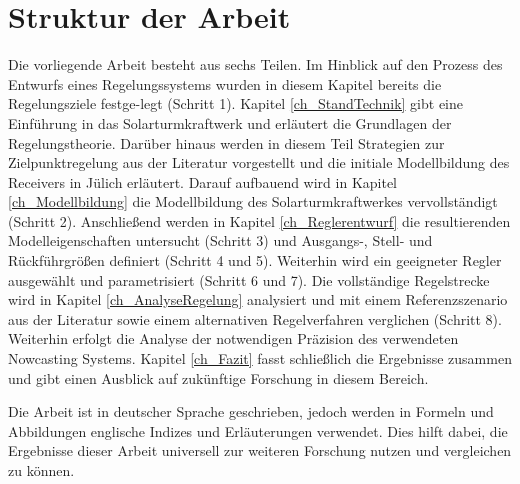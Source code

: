 \section{Struktur der Arbeit} \label{sec_Struktur}
Die vorliegende Arbeit besteht aus sechs Teilen.
Im Hinblick auf den Prozess des Entwurfs eines Regelungssystems wurden in diesem Kapitel bereits die Regelungsziele festge-\linebreak legt (Schritt 1).
Kapitel \ref{ch_StandTechnik} gibt eine Einführung in das Solarturmkraftwerk und erläutert die Grundlagen der Regelungstheorie.
Darüber hinaus werden in diesem Teil Strategien zur Zielpunktregelung aus der Literatur vorgestellt und die initiale Modellbildung des Receivers in Jülich erläutert.
Darauf aufbauend wird in Kapitel \ref{ch_Modellbildung} die Modellbildung des Solarturmkraftwerkes vervollständigt (Schritt 2).
Anschließend werden in Kapitel \ref{ch_Reglerentwurf} die resultierenden Modelleigenschaften untersucht (Schritt 3) und Ausgangs-, Stell- und Rückführgrößen definiert (Schritt 4 und 5).
Weiterhin wird ein geeigneter Regler ausgewählt und parametrisiert (Schritt 6 und 7).
Die vollständige Regelstrecke wird in Kapitel \ref{ch_AnalyseRegelung} analysiert und mit einem Referenzszenario aus der Literatur sowie einem alternativen Regelverfahren verglichen (Schritt 8).
Weiterhin erfolgt die Analyse der notwendigen Präzision des verwendeten Nowcasting Systems.
Kapitel \ref{ch_Fazit} fasst schließlich die Ergebnisse zusammen und gibt einen Ausblick auf zukünftige Forschung in diesem Bereich.

Die Arbeit ist in deutscher Sprache geschrieben, jedoch werden in Formeln und Abbildungen englische Indizes und Erläuterungen verwendet.
Dies hilft dabei, die Ergebnisse dieser Arbeit universell zur weiteren Forschung nutzen und vergleichen zu können.


